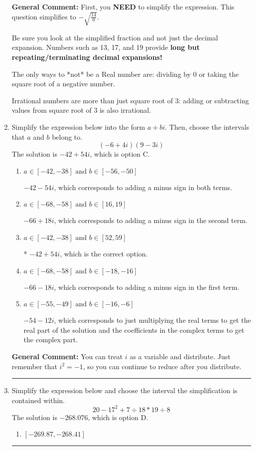 \documentclass{extbook}[14pt]
\newcommand{\litem}[1]{\item #1

\rule{\textwidth}{0.4pt}}
\begin{document}
\begin{enumerate}
{\textbf{General Comment:} First, you \textbf{NEED} to simplify the expression. This question simplifies to $-\sqrt{\frac{14}{0}}$. 
 
 Be sure you look at the simplified fraction and not just the decimal expansion. Numbers such as 13, 17, and 19 provide \textbf{long but repeating/terminating decimal expansions!} 
 
 The only ways to *not* be a Real number are: dividing by 0 or taking the square root of a negative number. 
 
 Irrational numbers are more than just square root of 3: adding or subtracting values from square root of 3 is also irrational.
}
\litem{
Simplify the expression below into the form $a+bi$. Then, choose the intervals that $a$ and $b$ belong to.
\[ (-6 + 4 i)(9 - 3 i) \]The solution is \( -42 + 54 i \), which is option C.\begin{enumerate}[label=\Alph*.]
\item \( a \in [-42, -38] \text{ and } b \in [-56, -50] \)

 $-42 - 54 i$, which corresponds to adding a minus sign in both terms.
\item \( a \in [-68, -58] \text{ and } b \in [16, 19] \)

 $-66 + 18 i$, which corresponds to adding a minus sign in the second term.
\item \( a \in [-42, -38] \text{ and } b \in [52, 59] \)

* $-42 + 54 i$, which is the correct option.
\item \( a \in [-68, -58] \text{ and } b \in [-18, -16] \)

 $-66 - 18 i$, which corresponds to adding a minus sign in the first term.
\item \( a \in [-55, -49] \text{ and } b \in [-16, -6] \)

 $-54 - 12 i$, which corresponds to just multiplying the real terms to get the real part of the solution and the coefficients in the complex terms to get the complex part.
\end{enumerate}

\textbf{General Comment:} You can treat $i$ as a variable and distribute. Just remember that $i^2=-1$, so you can continue to reduce after you distribute.
}
\litem{
Simplify the expression below and choose the interval the simplification is contained within.
\[ 20 - 17^2 + 7 \div 18 * 19 \div 8 \]The solution is \( -268.076 \), which is option D.\begin{enumerate}[label=\Alph*.]
\item \( [-269.87, -268.41] \)


\end{enumerate}}
\end{enumerate}
\end{document}
